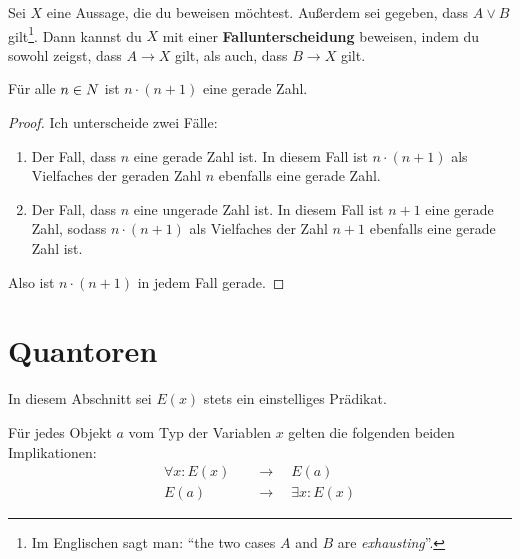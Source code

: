 \begin{axiom} \label{fallunterscheidung} 
    Sei $X$ eine Aussage, die du beweisen möchtest. Außerdem sei gegeben, dass $A\lor B$ gilt\footnote{Im Englischen sagt man: ``the two cases $A$ and $B$ are \emph{exhausting}''.}. Dann kannst du $X$ mit einer \textbf{Fallunterscheidung} beweisen, indem du sowohl zeigst, dass $A\to X$ gilt, als auch, dass $B\to X$ gilt.
\end{axiom}


\begin{bsp} \label{bsp:fallunterscheidung}
    Für alle $n\in \relax N$ ist $n\cdot (n+1)$ eine gerade Zahl.
\end{bsp}
\begin{proof}
    Ich unterscheide zwei Fälle:
    \begin{enumerate}[1)]
        \item Der Fall, dass $n$ eine gerade Zahl ist. In diesem Fall ist $n\cdot (n+1)$ als Vielfaches der geraden Zahl $n$ ebenfalls eine gerade Zahl.
        \item Der Fall, dass $n$ eine ungerade Zahl ist. In diesem Fall ist $n+1$ eine gerade Zahl, sodass $n\cdot (n+1)$ als Vielfaches der Zahl $n+1$ ebenfalls eine gerade Zahl ist.
    \end{enumerate}
    Also ist $n\cdot(n+1)$ in jedem Fall gerade.
\end{proof}





\section{Quantoren}


In diesem Abschnitt sei $E(x)$ stets ein einstelliges Prädikat.


\begin{axiom}[*] \label{quantorenaxiom}
    Für jedes Objekt $a$ vom Typ der Variablen $x$ gelten die folgenden beiden Implikationen:
    \begin{align*}
         \forall x: E(x) \quad& \to\quad E(a) \\
         E(a) \quad & \to\quad \exists x: E(x)
    \end{align*}
\end{axiom}

